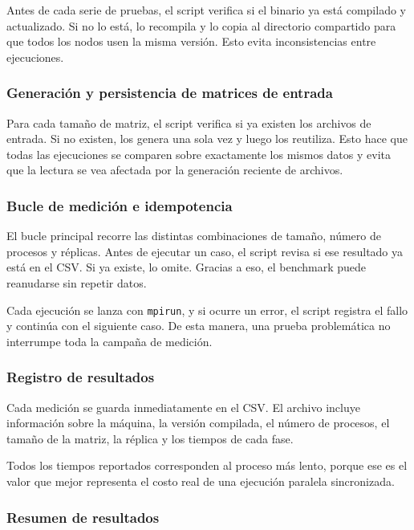 Antes de cada serie de pruebas, el script verifica si el binario ya está compilado y actualizado. Si no lo está, lo recompila y lo copia al directorio compartido para que todos los nodos usen la misma versión. Esto evita inconsistencias entre ejecuciones.

\subsubsection{Generación y persistencia de matrices de entrada}

Para cada tamaño de matriz, el script verifica si ya existen los archivos de entrada. Si no existen, los genera una sola vez y luego los reutiliza. Esto hace que todas las ejecuciones se comparen sobre exactamente los mismos datos y evita que la lectura se vea afectada por la generación reciente de archivos.

\subsubsection{Bucle de medición e idempotencia}

El bucle principal recorre las distintas combinaciones de tamaño, número de procesos y réplicas. Antes de ejecutar un caso, el script revisa si ese resultado ya está en el CSV. Si ya existe, lo omite. Gracias a eso, el benchmark puede reanudarse sin repetir datos.

Cada ejecución se lanza con \texttt{mpirun}, y si ocurre un error, el script registra el fallo y continúa con el siguiente caso. De esta manera, una prueba problemática no interrumpe toda la campaña de medición.

\subsubsection{Registro de resultados}

Cada medición se guarda inmediatamente en el CSV. El archivo incluye información sobre la máquina, la versión compilada, el número de procesos, el tamaño de la matriz, la réplica y los tiempos de cada fase.

Todos los tiempos reportados corresponden al proceso más lento, porque ese es el valor que mejor representa el costo real de una ejecución paralela sincronizada.

\subsubsection{Resumen de resultados}

